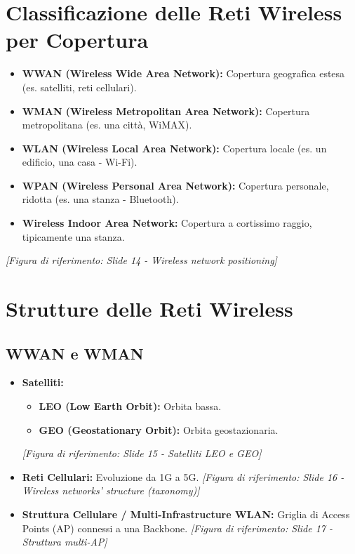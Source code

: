 \section{Classificazione delle Reti Wireless per Copertura}
\begin{itemize}
    \item \textbf{WWAN (Wireless Wide Area Network):} Copertura geografica estesa (es. satelliti, reti cellulari).
    \item \textbf{WMAN (Wireless Metropolitan Area Network):} Copertura metropolitana (es. una città, WiMAX).
    \item \textbf{WLAN (Wireless Local Area Network):} Copertura locale (es. un edificio, una casa - Wi-Fi).
    \item \textbf{WPAN (Wireless Personal Area Network):} Copertura personale, ridotta (es. una stanza - Bluetooth).
    \item \textbf{Wireless Indoor Area Network:} Copertura a cortissimo raggio, tipicamente una stanza.
\end{itemize}
\textit{[Figura di riferimento: Slide 14 - Wireless network positioning]}

\section{Strutture delle Reti Wireless}
\subsection{WWAN e WMAN}
\begin{itemize}
    \item \textbf{Satelliti:}
    \begin{itemize}
        \item \textbf{LEO (Low Earth Orbit):} Orbita bassa.
        \item \textbf{GEO (Geostationary Orbit):} Orbita geostazionaria.
    \end{itemize}
    \textit{[Figura di riferimento: Slide 15 - Satelliti LEO e GEO]}
    \item \textbf{Reti Cellulari:} Evoluzione da 1G a 5G.
    \textit{[Figura di riferimento: Slide 16 - Wireless networks' structure (taxonomy)]}
    \item \textbf{Struttura Cellulare / Multi-Infrastructure WLAN:} Griglia di Access Points (AP) connessi a una Backbone.
    \textit{[Figura di riferimento: Slide 17 - Struttura multi-AP]}
\end{itemize}
